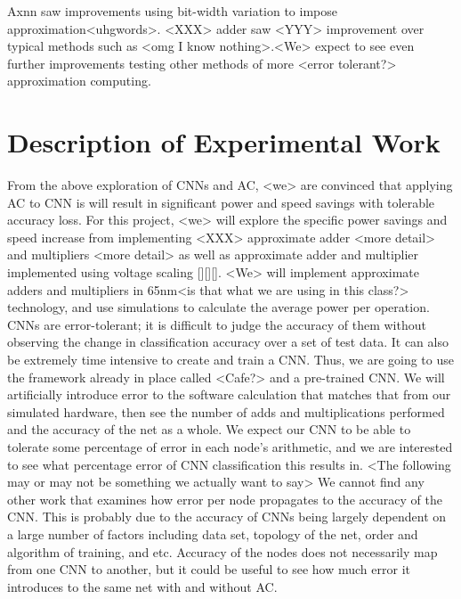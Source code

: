 \documentclass[conference]{IEEEtran}
\begin{document}
Axnn saw improvements using bit-width variation to impose approximation<uhgwords>. <XXX> adder saw <YYY> improvement over typical methods such as <omg I know nothing>.<We> expect to see even further improvements testing other methods of more <error tolerant?> approximation computing.




\section{Description of Experimental Work}
From the above exploration of CNNs and AC, <we> are convinced that applying AC to CNN is will result in significant power and speed savings with tolerable accuracy loss. For this project, <we> will explore the specific power savings and speed increase from implementing <XXX> approximate adder <more detail> and multipliers <more detail> as well as approximate adder and multiplier implemented using voltage scaling [][][]. 
<We> will implement approximate adders and multipliers in 65nm<is that what we are using in this class?> technology, and use simulations to calculate the average power per operation.
CNNs are error-tolerant; it is difficult to judge the accuracy of them without observing the change in classification accuracy over a set of test data. It can also be extremely time intensive to create and train a CNN. Thus, we are going to use the framework already in place called <Cafe?> and a pre-trained CNN. We will artificially introduce error to the software calculation that matches that from our simulated hardware, then see the number of adds and multiplications performed and the accuracy of the net as a whole.
We expect our CNN to be able to tolerate some percentage of error in each node's arithmetic, and we are interested to see what percentage error of CNN classification this results in. <The following may or may not be something we actually want to say> We cannot find any other work that examines how error per node propagates to the accuracy of the CNN. This is probably due to the accuracy of CNNs being largely dependent on a large number of factors including data set, topology of the net, order and algorithm of training, and etc. Accuracy of the nodes does not necessarily map from one CNN to another, but it could be useful to see how much error it introduces to the same net with and without AC.
\end{document}

